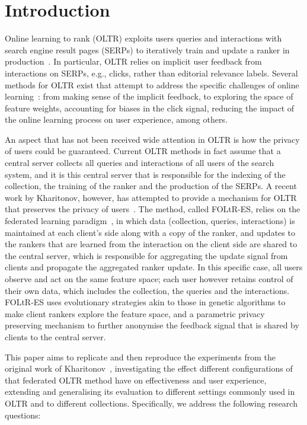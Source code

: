 \section{Introduction}

Online learning to rank (OLTR) exploits users queries and interactions with search engine result pages (SERPs) to iteratively train and update a ranker in  production~\cite{oosterhuis2018differentiable}. In particular, OLTR relies on implicit user feedback from interactions on SERPs, e.g., clicks, rather than editorial relevance labels. 
Several methods for OLTR exist that attempt to address the specific challenges of online learning~\cite{oosterhuis2018differentiable,joachims2017unbiased,zhuang2020counterfactual,jagerman2019model}: from making sense of the implicit feedback, to exploring the space of feature weights, accounting for biases in the click signal, reducing the impact of the online learning process on user experience, among others. 

An aspect that has not been received wide attention in OLTR is how the privacy of users could be guaranteed. Current OLTR methods in fact assume that a central server collects all queries and interactions of all users of the search system, and it is this central server that is responsible for the indexing of the collection, the training of the ranker and the production of the SERPs. A recent work by Kharitonov, however, has attempted to provide a mechanism for OLTR that preserves the privacy of users~\cite{kharitonov2019federated}. The method, called FOLtR-ES, relies on the federated learning paradigm~\cite{yang2019federated}, in which data (collection, queries, interactions) is maintained at each client's side along with a copy of the ranker, and updates to the rankers that are learned from the interaction on the client side are shared to the central server, which is responsible for aggregating the update signal from clients and propagate the aggregated ranker update. In this specific case, all users observe and act on the same feature space; each user however retains control of their own data, which includes the collection, the queries and the interactions. FOLtR-ES uses evolutionary strategies akin to those in genetic algorithms to make client rankers explore the feature space, and a parametric privacy preserving mechanism to further anonymise the feedback signal that is shared by clients to the central server.  


This paper aims to replicate and then reproduce the experiments from the original work of Kharitonov~\cite{kharitonov2019federated}, investigating the effect different configurations of that federated OLTR method have on effectiveness and user experience, extending and generalising its evaluation to different settings commonly used in OLTR and to different collections. Specifically, we address the following research questions:

